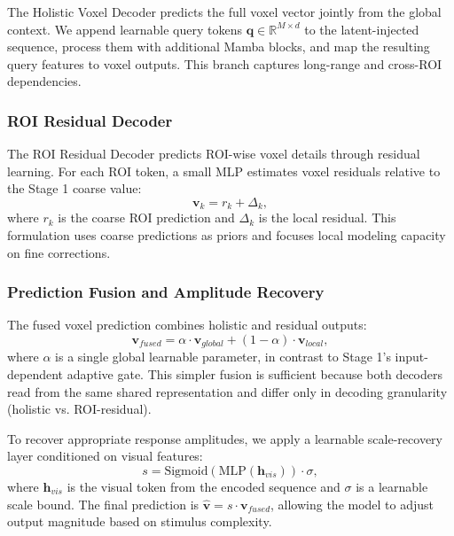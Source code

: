 The Holistic Voxel Decoder predicts the full voxel vector jointly from the global context. We append learnable query tokens $\mathbf{q} \in \mathbb{R}^{M \times d}$ to the latent-injected sequence, process them with additional Mamba blocks, and map the resulting query features to voxel outputs. This branch captures long-range and cross-ROI dependencies.

\subsubsection{ROI Residual Decoder}

The ROI Residual Decoder predicts ROI-wise voxel details through residual learning. For each ROI token, a small MLP estimates voxel residuals relative to the Stage 1 coarse value:
\begin{equation}
  \mathbf{v}_k = r_k + \Delta_k,
\end{equation}
where $r_k$ is the coarse ROI prediction and $\Delta_k$ is the local residual. This formulation uses coarse predictions as priors and focuses local modeling capacity on fine corrections.

\subsubsection{Prediction Fusion and Amplitude Recovery}

The fused voxel prediction combines holistic and residual outputs:
\begin{equation}
  \mathbf{v}_{fused} = \alpha \cdot \mathbf{v}_{global} + (1 - \alpha) \cdot \mathbf{v}_{local},
\end{equation}
where $\alpha$ is a single global learnable parameter, in contrast to Stage 1's input-dependent adaptive gate. This simpler fusion is sufficient because both decoders read from the same shared representation and differ only in decoding granularity (holistic vs. ROI-residual).

To recover appropriate response amplitudes, we apply a learnable scale-recovery layer conditioned on visual features:
\begin{equation}
  s = \text{Sigmoid}(\text{MLP}(\mathbf{h}_{vis})) \cdot \sigma,
\end{equation}
where $\mathbf{h}_{vis}$ is the visual token from the encoded sequence and $\sigma$ is a learnable scale bound. The final prediction is $\hat{\mathbf{v}} = s \cdot \mathbf{v}_{fused}$, allowing the model to adjust output magnitude based on stimulus complexity.

